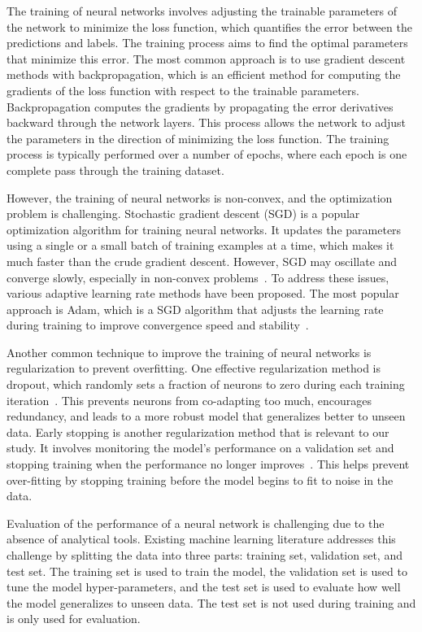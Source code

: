 The training of neural networks involves adjusting the trainable parameters of the network to minimize the loss function, which quantifies the error between the predictions and labels.
The training process aims to find the optimal parameters that minimize this error.
The most common approach is to use gradient descent methods with backpropagation, which is an efficient method for computing the gradients of the loss function with respect to the trainable parameters.
Backpropagation computes the gradients by propagating the error derivatives backward through the network layers.
This process allows the network to adjust the parameters in the direction of minimizing the loss function.
The training process is typically performed over a number of epochs, where each epoch is one complete pass through the training dataset.

However, the training of neural networks is non-convex, and the optimization problem is challenging.
Stochastic gradient descent (SGD) is a popular optimization algorithm for training neural networks.
It updates the parameters using a single or a small batch of training examples at a time, which makes it much faster than the crude gradient descent.
However, SGD may oscillate and converge slowly, especially in non-convex problems~\citep{bengio2016}.
To address these issues, various adaptive learning rate methods have been proposed.
The most popular approach is Adam, which is a SGD algorithm that adjusts the learning rate during training to improve convergence speed and stability~\citep{kingma2014adam}.

Another common technique to improve the training of neural networks is regularization to prevent overfitting.
One effective regularization method is dropout, which randomly sets a fraction of neurons to zero during each training iteration~\citep{srivastava2014dropout}.
This prevents neurons from co-adapting too much, encourages redundancy, and leads to a more robust model that generalizes better to unseen data.
Early stopping is another regularization method that is relevant to our study.
It involves monitoring the model's performance on a validation set and stopping training when the performance no longer improves~\citep{prechelt2002early}.
This helps prevent over-fitting by stopping training before the model begins to fit to noise in the data.

Evaluation of the performance of a neural network is challenging due to the absence of analytical tools.
Existing machine learning literature addresses this challenge by splitting the data into three parts: training set, validation set, and test set.
The training set is used to train the model, the validation set is used to tune the model hyper-parameters, and the test set is used to evaluate how well the model generalizes to unseen data.
The test set is not used during training and is only used for evaluation.

